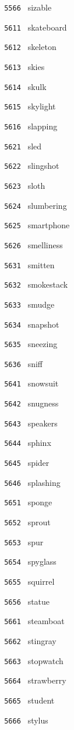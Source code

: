 \documentclass[11pt]{article}
\begin{document}
\begin{multicols}{6}
\noindent \texttt{ 5566 } sizable  \par
\noindent \texttt{ 5611 } skateboard  \par
\noindent \texttt{ 5612 } skeleton  \par
\noindent \texttt{ 5613 } skies  \par
\noindent \texttt{ 5614 } skulk  \par
\noindent \texttt{ 5615 } skylight  \par
\noindent \texttt{ 5616 } slapping  \par
\vspace{3mm}
\noindent \texttt{ 5621 } sled  \par
\noindent \texttt{ 5622 } slingshot  \par
\noindent \texttt{ 5623 } sloth  \par
\noindent \texttt{ 5624 } slumbering  \par
\noindent \texttt{ 5625 } smartphone  \par
\noindent \texttt{ 5626 } smelliness  \par
\vspace{3mm}
\noindent \texttt{ 5631 } smitten  \par
\noindent \texttt{ 5632 } smokestack  \par
\noindent \texttt{ 5633 } smudge  \par
\noindent \texttt{ 5634 } snapshot  \par
\noindent \texttt{ 5635 } sneezing  \par
\noindent \texttt{ 5636 } sniff  \par
\vspace{3mm}
\noindent \texttt{ 5641 } snowsuit  \par
\noindent \texttt{ 5642 } snugness  \par
\noindent \texttt{ 5643 } speakers  \par
\noindent \texttt{ 5644 } sphinx  \par
\noindent \texttt{ 5645 } spider  \par
\noindent \texttt{ 5646 } splashing  \par
\vspace{3mm}
\noindent \texttt{ 5651 } sponge  \par
\noindent \texttt{ 5652 } sprout  \par
\noindent \texttt{ 5653 } spur  \par
\noindent \texttt{ 5654 } spyglass  \par
\noindent \texttt{ 5655 } squirrel  \par
\noindent \texttt{ 5656 } statue  \par
\vspace{3mm}
\noindent \texttt{ 5661 } steamboat  \par
\noindent \texttt{ 5662 } stingray  \par
\noindent \texttt{ 5663 } stopwatch  \par
\noindent \texttt{ 5664 } strawberry  \par
\noindent \texttt{ 5665 } student  \par
\noindent \texttt{ 5666 } stylus  \par
\end{multicols}
\end{document}
